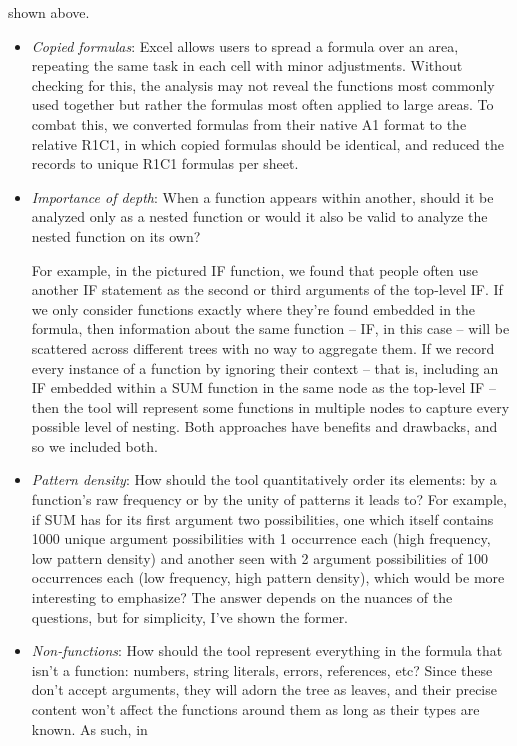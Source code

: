 \documentclass[conference]{IEEEtran}
\begin{document}
	shown above. \begin{itemize} \item \textit{Copied formulas}: Excel allows users
		to spread a formula over an area, repeating the same task in each cell with
		minor adjustments. Without checking for this, the analysis may not reveal the
		functions most commonly used together but rather the formulas most often
		applied to large areas. To combat this, we converted formulas from their native
		A1 format to the relative R1C1, in which copied formulas should be identical,
		and reduced the records to unique R1C1 formulas per sheet. \item
		\textit{Importance of depth}: When a function appears within another, should it
		be analyzed only as a nested function or would it also be valid to analyze the
		nested function on its own?  \par For example, in the pictured IF function, we
		found that people often use another IF statement as the second or third
		arguments of the top-level IF. If we only consider functions exactly where
		they're found embedded in the formula, then information about the same function
		-- IF, in this case -- will be scattered across different trees with no way to
		aggregate them. If we record every instance of a function by ignoring their
		context -- that is, including an IF embedded within a SUM function in the same
		node as the top-level IF -- then the tool will represent some functions in
		multiple nodes to capture every possible level of nesting. Both approaches have
		benefits and drawbacks, and so we included both. \item \textit{Pattern
			density}: How should the tool quantitatively order its elements: by a
		function's raw frequency or by the unity of patterns it leads to? For example,
		if SUM has for its first argument two possibilities, one which itself contains
		1000 unique argument possibilities with 1 occurrence each (high frequency, low
		pattern density) and another seen with 2 argument possibilities of 100
		occurrences each (low frequency, high pattern density), which would be more
		interesting to emphasize? The answer depends on the nuances of the questions,
		but for simplicity, I've shown the former. \item \textit{Non-functions}: How
		should the tool represent everything in the formula that isn't a function:
		numbers, string literals, errors, references, etc? Since these don't accept
		arguments, they will adorn the tree as leaves, and their precise content won't
		affect the functions around them as long as their types are known. As such, in

\end{itemize}
\end{document}
